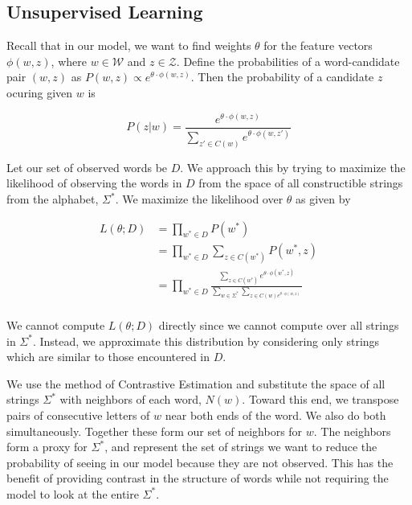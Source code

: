 \documentclass[11pt,twocolumn]{article}
\begin{document}
\subsection{Unsupervised Learning}
Recall that in our model, we want to find weights $\theta$ for the feature vectors $\phi(w,z)$, where $w\in\mathcal W$ and $z\in\mathcal Z$. Define the probabilities of a word-candidate pair $(w,z)$ as $P(w,z)\propto e^{\theta\cdot\phi(w,z)}$. Then the probability of a candidate $z$ ocuring given $w$ is

\begin{equation}
    \label{equ:prob_par}
    P(z|w) = \frac{e^{\theta\cdot\phi(w,z)}} {\sum_{z'\in C(w)} e^{\theta\cdot\phi(w,z')}}
\end{equation}

Let our set of observed words be $D$. We approach this by trying to maximize the likelihood of observing the words in $D$ from the space of all constructible strings from the alphabet, $\Sigma^*$. We maximize the likelihood over $\theta$ as given by

\begin{equation}
    \begin{split}
        L(\theta; D) &= \prod_{w^*\in D} P(w^*) \\
        &= \prod_{w^*\in D} \sum_{z\in C(w^*)} P(w^*, z) \\
        &= \prod_{w^*\in D} \frac{\sum_{z\in C(w^*)} e^{\theta\cdot\phi(w^*,z)}} {\sum_{w\in\Sigma^*}\sum_{z\in C(w) e^{\theta\cdot\phi(w,z)}}} \\
    \end{split}
\end{equation}

We cannot compute $L(\theta; D)$ directly since we cannot compute over all strings in $\Sigma^*$. Instead, we approximate this distribution by considering only strings which are similar to those encountered in $D$.

We use the method of Contrastive Estimation \citep{Smith05} and substitute the space of all strings $\Sigma^*$ with neighbors of each word, $N(w)$. Toward this end, we transpose pairs of consecutive letters of $w$ near both ends of the word. We also do both simultaneously. Together these form our set of neighbors for $w$. The neighbors form a proxy for $\Sigma^*$, and represent the set of strings we want to reduce the probability of seeing in our model because they are not observed. This has the benefit of providing contrast in the structure of words while not requiring the model to look at the entire $\Sigma^*$.
\end{document}
